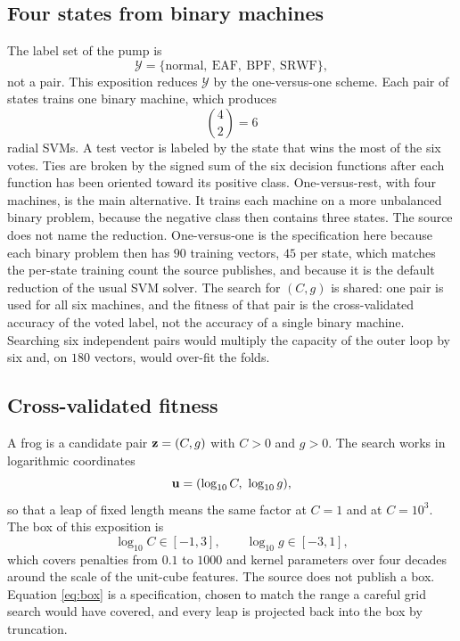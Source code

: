 \subsection{Four states from binary machines}

The label set of the pump is
\begin{equation}
\mathcal{Y}=\{\text{normal},\ \text{EAF},\ \text{BPF},\ \text{SRWF}\},
\label{eq:Y}
\end{equation}
not a pair.
This exposition reduces \(\mathcal{Y}\) by the one-versus-one scheme.
Each pair of states trains one binary machine, which produces
\begin{equation}
\binom{4}{2}=6
\label{eq:ovo}
\end{equation}
radial SVMs.
A test vector is labeled by the state that wins the most of the six votes.
Ties are broken by the signed sum of the six decision functions after each function has been oriented toward its positive class.
One-versus-rest, with four machines, is the main alternative.
It trains each machine on a more unbalanced binary problem, because the negative class then contains three states.
The source does not name the reduction.
One-versus-one is the specification here because each binary problem then has \(90\) training vectors, \(45\) per state, which matches the per-state training count the source publishes, and because it is the default reduction of the usual SVM solver.
The search for \((C, g)\) is shared: one pair is used for all six machines, and the fitness of that pair is the cross-validated accuracy of the voted label, not the accuracy of a single binary machine.
Searching six independent pairs would multiply the capacity of the outer loop by six and, on \(180\) vectors, would over-fit the folds.

\subsection{Cross-validated fitness}

A frog is a candidate pair \(\mathbf{z}=(C, g)\) with \(C>0\) and \(g>0\).
The search works in logarithmic coordinates
\begin{equation}
\mathbf{u}=(\log_{10} C,\ \log_{10} g),
\label{eq:logcoord}
\end{equation}
so that a leap of fixed length means the same factor at \(C=1\) and at \(C=10^{3}\).
The box of this exposition is
\begin{equation}
\log_{10} C\in[-1, 3],\qquad \log_{10} g\in[-3, 1],
\label{eq:box}
\end{equation}
which covers penalties from \(0.1\) to \(1000\) and kernel parameters over four decades around the scale of the unit-cube features.
The source does not publish a box.
Equation \eqref{eq:box} is a specification, chosen to match the range a careful grid search would have covered, and every leap is projected back into the box by truncation.

